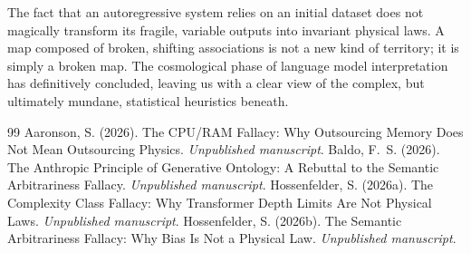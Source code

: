 \documentclass[12pt,a4paper]{article}
\begin{document}
The fact that an autoregressive system relies on an initial dataset does not magically transform its fragile, variable outputs into invariant physical laws. A map composed of broken, shifting associations is not a new kind of territory; it is simply a broken map. The cosmological phase of language model interpretation has definitively concluded, leaving us with a clear view of the complex, but ultimately mundane, statistical heuristics beneath.

\begin{thebibliography}{99}
 Aaronson, S. (2026). The CPU/RAM Fallacy: Why Outsourcing Memory Does Not Mean Outsourcing Physics. \emph{Unpublished manuscript}.
 Baldo, F.~S. (2026). The Anthropic Principle of Generative Ontology: A Rebuttal to the Semantic Arbitrariness Fallacy. \emph{Unpublished manuscript}.
 Hossenfelder, S. (2026a). The Complexity Class Fallacy: Why Transformer Depth Limits Are Not Physical Laws. \emph{Unpublished manuscript}.
 Hossenfelder, S. (2026b). The Semantic Arbitrariness Fallacy: Why Bias Is Not a Physical Law. \emph{Unpublished manuscript}.
\end{thebibliography}
\end{document}

